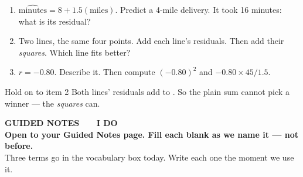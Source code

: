 \documentclass[aspectratio=169, 11pt]{beamer}
\begin{document}
\begin{frame}[t, plain]
  \begin{enumerate}\setlength{\itemsep}{6pt}
    \item $\widehat{\text{minutes}} = 8 + 1.5(\text{miles})$. Predict a 4-mile delivery. It
          took 16 minutes: what is its residual?
    \item Two lines, the same four points. Add each line's residuals. Then add their
          \emph{squares}. Which line fits better?
    \item $r = -0.80$. Describe it. Then compute $(-0.80)^2$ and $-0.80 \times 45/1.5$.
  \end{enumerate}
  \vspace{6pt}
  \begin{block}{Hold on to item 2}
    Both lines' residuals add to . So the plain sum cannot pick a winner ---
    the \emph{squares} can.
  \end{block}
\end{frame}

{
\begin{frame}[plain]
  \vspace{1.8cm}\hspace{0.8cm}%
  \begin{minipage}{0.86\textwidth}
    {\color{goldacc}\bfseries\small GUIDED NOTES \ \textbullet\ \ I DO}\\[0.7cm]
    {\color{white}\bfseries\Large Open to your Guided Notes page. Fill each blank as we
    name it --- not before.}\\[0.9cm]
    {\color{skymid}\small Three terms go in the vocabulary box today. Write each one the
    moment we use it.}
  \end{minipage}
\end{frame}
}
\end{document}
